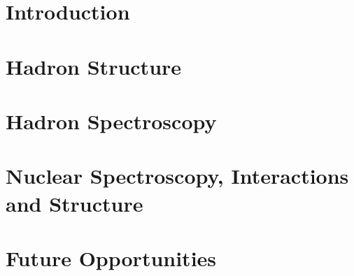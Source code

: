 \documentclass[aps,prd,nofootinbib,floatfix,superscriptaddress,preprint,tightenlines]{revtex4-1}
\begin{document}
\section{Introduction}
\label{sec:intro}


\section{Hadron Structure}
\label{sec:hadronstructure}


\section{Hadron Spectroscopy}
\label{sec:hadronspectroscopy}


\section{Nuclear Spectroscopy, Interactions and Structure}
\label{sec:nuclear}


\section{Future Opportunities}
\label{sec:future}


\begin{figure}
    \vspace*{3cm}
\end{figure}



\end{document}
